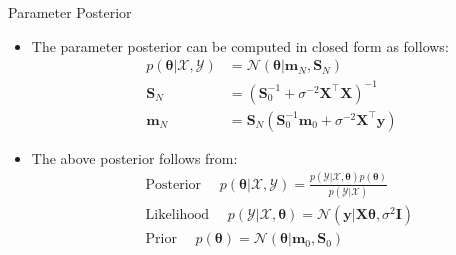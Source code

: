 \documentclass{beamer}
\begin{document}
\begin{frame}{Parameter Posterior}
\begin{itemize}[<+->]
\item The parameter posterior can be computed in closed form as follows:
\begin{equation*}
\begin{aligned}
p(\boldsymbol{\theta} | \mathcal{X}, \mathcal{Y}) &=\mathcal{N}\left(\boldsymbol{\theta} | \boldsymbol{m}_{N}, \boldsymbol{S}_{N}\right) \\
\boldsymbol{S}_{N} &=\left(\boldsymbol{S}_{0}^{-1}+\sigma^{-2} \mathbf{X}^{\top} \boldsymbol{X}\right)^{-1} \\
\boldsymbol{m}_{N} &=\boldsymbol{S}_{N}\left(\boldsymbol{S}_{0}^{-1} \boldsymbol{m}_{0}+\sigma^{-2} \boldsymbol{X}^{\top} \boldsymbol{y}\right)
\end{aligned}
\end{equation*}
\item The above posterior follows from:
\begin{equation*}
\begin{aligned}
&\text { Posterior } \quad p(\boldsymbol{\theta} | \mathcal{X}, \mathcal{Y})=\frac{p(\mathcal{Y} | \mathcal{X}, \boldsymbol{\theta}) p(\boldsymbol{\theta})}{p(\mathcal{Y} | \mathcal{X})}\\
&\text { Likelihood } \quad p(\mathcal{Y} | \mathcal{X}, \boldsymbol{\theta})=\mathcal{N}\left(\boldsymbol{y} | \boldsymbol{X} \boldsymbol{\theta}, \sigma^{2} \boldsymbol{I}\right)\\
&\text { Prior } \quad p(\boldsymbol{\theta})=\mathcal{N}\left(\boldsymbol{\theta} | \boldsymbol{m}_{0}, \boldsymbol{S}_{0}\right)
\end{aligned}
\end{equation*}
\end{itemize}
\end{frame}
\end{document}
